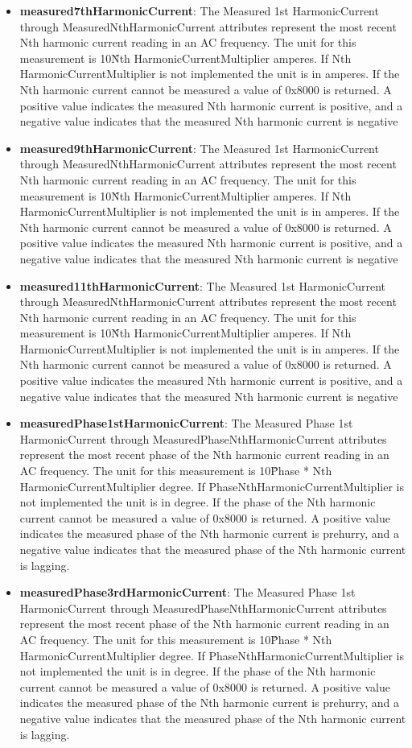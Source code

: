 \begin{itemize}
\item \textbf{measured7thHarmonicCurrent}: The Measured 1st HarmonicCurrent through MeasuredNthHarmonicCurrent attributes represent the most recent Nth harmonic current reading in an AC frequency. The unit for this measurement is 10\^Nth HarmonicCurrentMultiplier amperes. If Nth HarmonicCurrentMultiplier is not implemented the unit is in amperes. If the Nth harmonic current cannot be measured a value of 0x8000 is returned. A positive value indicates the measured Nth harmonic current is positive, and a negative value indicates that the measured Nth harmonic current is negative
\item \textbf{measured9thHarmonicCurrent}: The Measured 1st HarmonicCurrent through MeasuredNthHarmonicCurrent attributes represent the most recent Nth harmonic current reading in an AC frequency. The unit for this measurement is 10\^Nth HarmonicCurrentMultiplier amperes. If Nth HarmonicCurrentMultiplier is not implemented the unit is in amperes. If the Nth harmonic current cannot be measured a value of 0x8000 is returned. A positive value indicates the measured Nth harmonic current is positive, and a negative value indicates that the measured Nth harmonic current is negative
\item \textbf{measured11thHarmonicCurrent}: The Measured 1st HarmonicCurrent through MeasuredNthHarmonicCurrent attributes represent the most recent Nth harmonic current reading in an AC frequency. The unit for this measurement is 10\^Nth HarmonicCurrentMultiplier amperes. If Nth HarmonicCurrentMultiplier is not implemented the unit is in amperes. If the Nth harmonic current cannot be measured a value of 0x8000 is returned. A positive value indicates the measured Nth harmonic current is positive, and a negative value indicates that the measured Nth harmonic current is negative
\item \textbf{measuredPhase1stHarmonicCurrent}: The Measured Phase 1st HarmonicCurrent through MeasuredPhaseNthHarmonicCurrent attributes represent the most recent phase of the Nth harmonic current reading in an AC frequency. The unit for this measurement is 10\^Phase * Nth HarmonicCurrentMultiplier degree. If PhaseNthHarmonicCurrentMultiplier is not implemented the unit is in degree. If the phase of the Nth harmonic current cannot be measured a value of 0x8000 is returned. A positive value indicates the measured phase of the Nth harmonic current is prehurry, and a negative value indicates that the measured phase of the Nth harmonic current is lagging.	
\item \textbf{measuredPhase3rdHarmonicCurrent}: The Measured Phase 1st HarmonicCurrent through MeasuredPhaseNthHarmonicCurrent attributes represent the most recent phase of the Nth harmonic current reading in an AC frequency. The unit for this measurement is 10\^Phase * Nth HarmonicCurrentMultiplier degree. If PhaseNthHarmonicCurrentMultiplier is not implemented the unit is in degree. If the phase of the Nth harmonic current cannot be measured a value of 0x8000 is returned. A positive value indicates the measured phase of the Nth harmonic current is prehurry, and a negative value indicates that the measured phase of the Nth harmonic current is lagging.	

\end{itemize}
